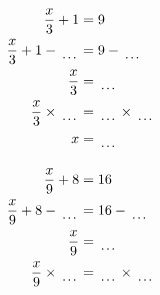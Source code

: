 \documentclass[12pt]{article}
\newcounter{minipagecount}
\begin{document}
\begin{multicols}{2}
\begin{minipage}[t]{0.45\textwidth}
    \raggedright %
    \begin{align*} %
        \frac{x}{3} + 1 &= 9\\
        \frac{x}{3} + 1 - \dotuline{\hspace{5mm}} &= 9 - \dotuline{\hspace{5mm}}\\
        \frac{x}{3} &= \dotuline{\hspace{5mm}}\\
        \frac{x}{3} \times\dotuline{\hspace{5mm}} &= \dotuline{\hspace{5mm}} \times\dotuline{\hspace{5mm}}\\
        x &= \dotuline{\hspace{5mm}}\\
    \end{align*}
\end{minipage} %
\noindent{(\theminipagecount)}\hspace{0.1mm} %
\begin{minipage}[t]{0.45\textwidth} %
    \vspace{-26pt}  %
    \raggedright %
    \begin{align*} %
        \frac{x}{9} + 8 &= 16\\
        \frac{x}{9} + 8 - \dotuline{\hspace{5mm}} &= 16 - \dotuline{\hspace{5mm}}\\
        \frac{x}{9} &= \dotuline{\hspace{5mm}}\\
        \frac{x}{9} \times\dotuline{\hspace{5mm}} &= \dotuline{\hspace{5mm}} \times\dotuline{\hspace{5mm}}\\

\end{align*}
\end{minipage}
\end{multicols}
\end{document}
